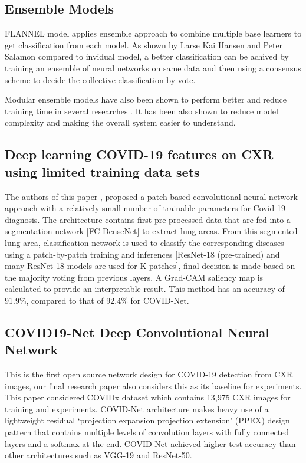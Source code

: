 \documentclass{sigkddExp}
\begin{document}
\subsection{Ensemble Models}

FLANNEL model applies ensemble approach to combine multiple base learners to get
classification from each model. As shown by Larse Kai Hansen and Peter Salamon
\cite{58871} compared to invidual model, a better classification can be achived
by training an ensemble of neural networks on same data and then using a
consensus scheme to decide the collective classification by vote.

Modular ensemble models have also been shown to perform better and reduce
training time in several researches \cite{combine}. It has been also shown to
reduce model complexity and making the overall system easier to understand.

\subsection{Deep learning COVID-19 features on CXR using limited training data sets}

The authors of this paper \cite{pmid32396075}, proposed a patch-based
convolutional neural network approach with a relatively small number of
trainable parameters for Covid-19 diagnosis. The architecture contains first
pre-processed data that are fed into a segmentation network [FC-DenseNet] to
extract lung areas. From this segmented lung area, classification network is
used to classify the corresponding diseases using a patch-by-patch training and
inferences [ResNet-18 (pre-trained) and many ResNet-18 models are used for K
        patches], final decision is made based on the majority voting from previous
layers. A Grad-CAM saliency map is calculated to provide an interpretable
result. This method has an accuracy of 91.9\%, compared to that of 92.4\% for
COVID-Net.

\subsection{COVID19-Net Deep Convolutional Neural Network}

This is the first open source network design for COVID-19 detection from CXR images,
our final research paper also considers this as its baseline for experiments.
This paper considered COVIDx dataset which contains 13,975 CXR images for training and
experiments. COVID-Net architecture makes heavy use of a lightweight residual
‘projection expansion projection extension’ (PPEX) design pattern that contains multiple
levels of convolution layers with fully connected layers and a softmax at the end.
COVID-Net achieved higher test accuracy than other architectures such as VGG-19 and ResNet-50.
\end{document}
